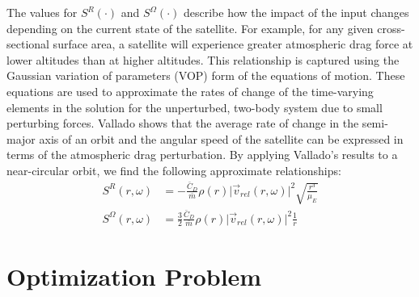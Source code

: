 \documentclass[letterpaper, 10 pt, conference]{ieeeconf}  %
\begin{document}
The values for $S^{R} \left( \cdot \right)$ and $S^{\Omega} \left( \cdot \right)$ \iffalse$S_{r_i} \left( r_i \left(k \right),\omega_i \left(k \right) \right)$ and $S_{\omega_i}\left( r_i \left(k \right),\omega_i \left(k \right) \right)$\fi describe how the impact of the input changes depending on the current state of the satellite. For example, for any given cross-sectional surface area, a satellite will experience greater atmospheric drag force at lower altitudes than at higher altitudes. This relationship is captured using the Gaussian variation of parameters (VOP) form of the equations of motion. These equations are used to approximate the rates of change of the time-varying elements in the solution for the unperturbed, two-body system due to small perturbing forces. Vallado \cite{Vallado} shows that the average rate of change in the semi-major axis of an orbit and the angular speed of the satellite can be expressed in terms of the atmospheric drag perturbation. By applying Vallado's results to a near-circular orbit, we find the following approximate relationships:
\begin{subequations}
\begin{align}
S^{R}(r,\omega) &= -\frac{\bar{C}_D}{\bar{m}}\rho(r) \lvert \vec{v}_{rel}(r,\omega) \rvert^2 \sqrt{\frac{r^3}{\mu_{\scriptscriptstyle E}}} \\
S^{\Omega}(r,\omega) &= \frac{3}{2} \frac{\bar{C}_D}{\bar{m}}\rho(r) \lvert \vec{v}_{rel}(r,\omega) \rvert^2 \frac{1}{r}
\end{align}
\label{eqn:SrSw}
\end{subequations}

\section{Optimization Problem}
\end{document}

